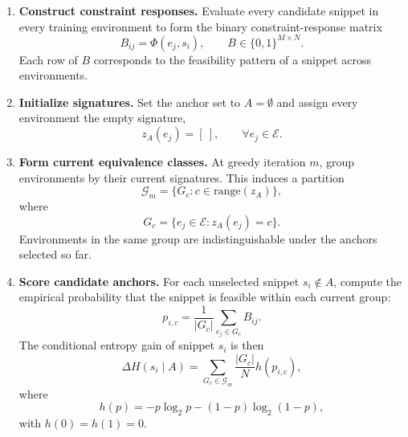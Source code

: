 \begin{enumerate}
    \item \textbf{Construct constraint responses.}
    Evaluate every candidate snippet in every training environment to form the binary constraint-response matrix
    \begin{equation}
        B_{ij} = \Phi(e_j,s_i),
        \qquad
        B\in\{0,1\}^{M\times N}.
    \end{equation}
    Each row of $B$ corresponds to the feasibility pattern of a snippet across environments.

    \item \textbf{Initialize signatures.}
    Set the anchor set to $A=\emptyset$ and assign every environment the empty signature,
    \begin{equation}
        z_A(e_j) = [\ ],
        \qquad \forall e_j\in\mathcal{E}.
    \end{equation}

    \item \textbf{Form current equivalence classes.}
    At greedy iteration $m$, group environments by their current signatures. This induces a partition
    \begin{equation}
        \mathcal{G}_m = \{G_c : c \in \mathrm{range}(z_A)\},
    \end{equation}
    where
    \begin{equation}
        G_c = \{e_j\in\mathcal{E}: z_A(e_j)=c\}.
    \end{equation}
    Environments in the same group are indistinguishable under the anchors selected so far.

    \item \textbf{Score candidate anchors.}
    For each unselected snippet $s_i\notin A$, compute the empirical probability that the snippet is feasible within each current group:
    \begin{equation}
        p_{i,c}
        =
        \frac{1}{|G_c|}
        \sum_{e_j\in G_c} B_{ij}.
    \end{equation}
    The conditional entropy gain of snippet $s_i$ is then
    \begin{equation}
        \Delta H(s_i\mid A)
        =
        \sum_{G_c\in\mathcal{G}_m}
        \frac{|G_c|}{N}
        h(p_{i,c}),
    \end{equation}
    where
    \begin{equation}
        h(p)=-p\log_2 p-(1-p)\log_2(1-p),
    \end{equation}
    with $h(0)=h(1)=0$.


\end{enumerate}
